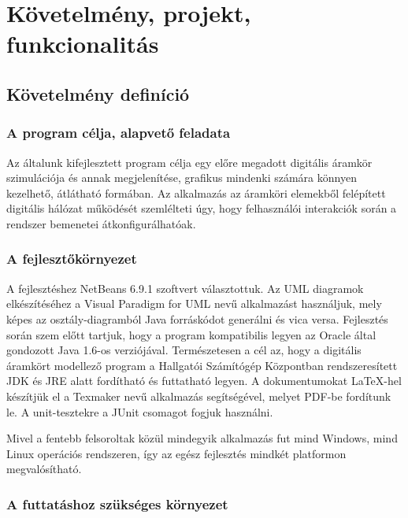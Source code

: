 %
\chapter{Követelmény, projekt, funkcionalitás}

\thispagestyle{fancy}

\section{Követelmény definíció}
\label{sec:reqdef}

\subsection{A program célja, alapvető feladata}

Az általunk kifejlesztett program célja egy előre megadott digitális áramkör szimulációja és annak megjelenítése, grafikus mindenki számára könnyen kezelhető, átlátható formában. Az alkalmazás az áramköri elemekből felépített digitális hálózat működését szemlélteti úgy, hogy felhasználói interakciók során a rendszer bemenetei átkonfigurálhatóak.

\subsection{A fejlesztőkörnyezet}
\label{sec:devenvironment}

A fejlesztéshez NetBeans 6.9.1 szoftvert választottuk. Az UML diagramok elkészítéséhez a Visual Paradigm for UML nevű alkalmazást használjuk, mely képes az osztály-diagramból Java forráskódot generálni és vica versa. Fejlesztés során szem előtt tartjuk, hogy a program kompatibilis legyen az Oracle által gondozott Java 1.6-os verziójával. Természetesen a cél az, hogy a digitális áramkört modellező program a Hallgatói Számítógép Központban rendszeresített JDK és JRE alatt fordítható és futtatható legyen. A dokumentumokat \LaTeX{}-hel készítjük el a Texmaker nevű alkalmazás segítségével, melyet PDF-be fordítunk le. A unit-tesztekre a JUnit csomagot fogjuk használni.

Mivel a fentebb felsoroltak közül mindegyik alkalmazás fut mind Windows, mind Linux operációs rendszeren, így az egész fejlesztés mindkét platformon megvalósítható.

\subsection{A futtatáshoz szükséges környezet}

